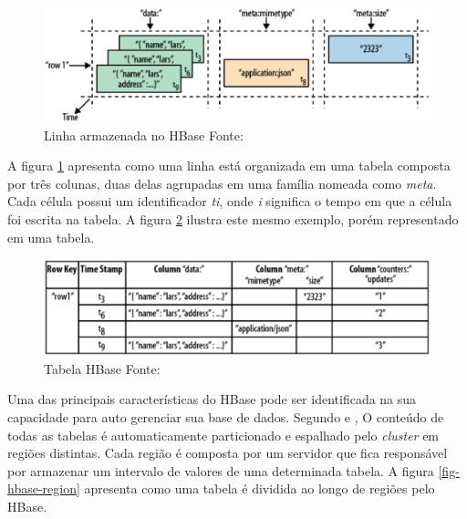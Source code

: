 \begin{figure}[ht!]
	\centering
	\includegraphics[keepaspectratio=true,scale=0.4]
	  {figuras/hbase-row.eps}
	\caption[Linha armazenada no HBase]{Linha armazenada no HBase
	\protect\linebreak Fonte: \cite{george2011}}
	\label{fig-hbase-row}
\end{figure}
\FloatBarrier

A figura \ref{fig-hbase-row} apresenta como uma linha está organizada em uma tabela composta por três colunas, duas delas agrupadas em uma família nomeada como \textit{meta}. Cada célula possui um identificador \textit{ti}, onde \textit{i} significa o tempo em que a célula foi escrita na tabela. A figura \ref{fig-hbase-table} ilustra este mesmo exemplo, porém representado em uma tabela.

\begin{figure}[ht!]
	\centering
	\includegraphics[keepaspectratio=true,scale=0.4]
	  {figuras/hbase-table.eps}
	\caption[Tabela HBase]{Tabela HBase
	\protect\linebreak Fonte: \cite{george2011}}
	\label{fig-hbase-table}
\end{figure}
\FloatBarrier

Uma das principais características do HBase pode ser identificada na sua capacidade para auto gerenciar sua base de dados. Segundo  e , O conteúdo de todas as tabelas é automaticamente particionado e espalhado pelo \textit{cluster} em regiões distintas. Cada região é composta por um servidor que fica responsável por armazenar um intervalo de valores de uma determinada tabela. A figura \ref{fig-hbase-region} apresenta como uma tabela é dividida ao longo de regiões pelo HBase.

